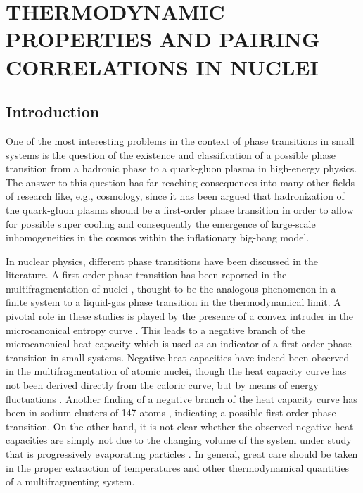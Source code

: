 \documentclass[rmp,aps,floatfix]{revtex4}
\begin{document}

%

\section{THERMODYNAMIC PROPERTIES AND PAIRING CORRELATIONS IN NUCLEI}
\label{sec:leveldensities_sec3}

\subsection{Introduction}

One of the 
most interesting problems in the context of phase transitions in small systems
is the question of the 
existence and classification of a possible phase transition from a hadronic 
phase to a quark-gluon plasma in high-energy physics. The answer to this 
question has far-reaching consequences into many other fields of research like,
e.g., cosmology, since it has been argued that hadronization of the quark-gluon
plasma should be a first-order phase transition in order to allow for possible 
super cooling and consequently the emergence of large-scale inhomogeneities in 
the cosmos within the inflationary big-bang model. 

In nuclear physics, different phase transitions have been discussed in the 
literature. A first-order phase transition has been reported in the 
multifragmentation of nuclei \cite{agostino00}, thought to be the analogous 
phenomenon in a finite system to a liquid-gas phase transition in the 
thermodynamical limit. A pivotal role in these studies is played by the 
presence of a convex intruder in the microcanonical entropy curve 
\cite{gross97,gross99}. This leads to a 
negative branch of the microcanonical heat 
capacity which is used as an indicator of a first-order phase transition in 
small systems. Negative heat capacities have indeed been observed in the 
multifragmentation of atomic nuclei, though the heat capacity curve has not 
been derived directly from the caloric curve, but by means of energy 
fluctuations \cite{agostino00,CD00}. 
Another finding of a negative branch of the heat
capacity curve has been in sodium clusters of 147 atoms \cite{schmidt01}, indicating
a possible first-order phase transition. On the other hand, it is not clear 
whether the observed negative heat capacities are simply not due to the changing 
volume of the system under study that is progressively evaporating particles 
\cite{moretto01}. In general, great care should be 
taken in the proper extraction of
temperatures and other thermodynamical quantities of a multifragmenting system.
\end{document}
